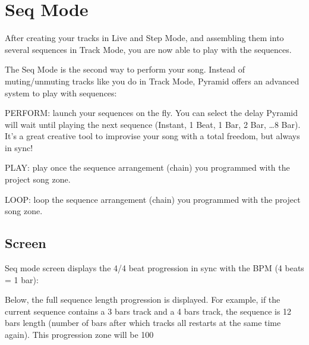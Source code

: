 \chapter{Seq Mode}

After creating your tracks in Live and Step Mode, and assembling them into several sequences in Track Mode, you are now able to play with the sequences.

The Seq Mode is the second way to perform your song. Instead of muting/unmuting tracks like you do in Track Mode, Pyramid offers an advanced system to play with sequences:


PERFORM: launch your sequences on the fly. You can select the delay Pyramid will wait until playing the next sequence (Instant, 1 Beat, 1 Bar, 2 Bar, \ldots 8 Bar). It's a great creative tool to improvise your song with a total freedom, but always in sync!

PLAY: play once the sequence arrangement (chain) you programmed with the project song zone.

LOOP: loop the sequence arrangement (chain) you programmed with the project song zone.



\section{Screen}


Seq mode screen displays the 4/4 beat progression in sync with the BPM (4 beats = 1 bar):


Below, the full sequence length progression is displayed. For example, if the current sequence contains a 3 bars track and a 4 bars track, the sequence is 12 bars length (number of bars after which tracks all restarts at the same time again). This progression zone will be 100%




